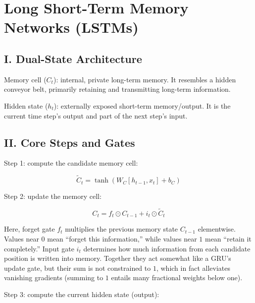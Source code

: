 \setcounter{section}{4}

\hypertarget{long-short-term-memory-networks-lstms}{%
\section{Long Short-Term Memory Networks (LSTMs)}\label{long-short-term-memory-networks-lstms}}

\hypertarget{i.-dual-state-architecture}{%
\subsection{I. Dual-State Architecture}\label{i.-dual-state-architecture}}

Memory cell (\(C_t\)): internal, private long-term memory. It resembles a hidden conveyor belt, primarily retaining and transmitting long-term information.

Hidden state (\(h_t\)): externally exposed short-term memory/output. It is the current time step's output and part of the next step's input.

\hypertarget{ii.-core-steps-and-gates}{%
\subsection{II. Core Steps and Gates}\label{ii.-core-steps-and-gates}}

Step 1: compute the candidate memory cell:

\[
\tilde{C}_t = \tanh(W_C [h_{t-1}, x_t] + b_C)
\]

Step 2: update the memory cell:

\[
C_t = f_t \odot C_{t-1} + i_t \odot \tilde{C}_t
\]

Here, forget gate \(f_t\) multiplies the previous memory state \(C_{t-1}\) elementwise. Values near \(0\) mean ``forget this information,'' while values near \(1\) mean ``retain it completely.'' Input gate \(i_t\) determines how much information from each candidate position is written into memory. Together they act somewhat like a GRU's update gate, but their sum is not constrained to \(1\), which in fact alleviates vanishing gradients (summing to \(1\) entails many fractional weights below one).

Step 3: compute the current hidden state (output):

